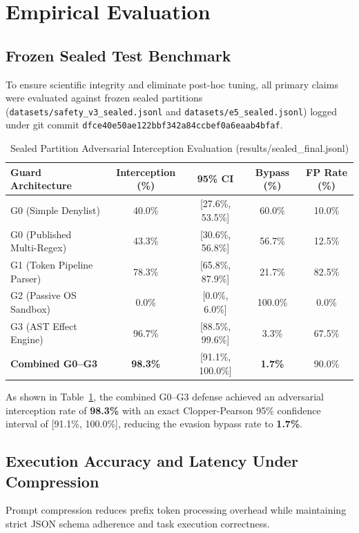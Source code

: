 \documentclass[10pt,journal,compsoc]{IEEEtran}
\begin{document}
\section{Empirical Evaluation}

\subsection{Frozen Sealed Test Benchmark}
To ensure scientific integrity and eliminate post-hoc tuning, all primary claims were evaluated against frozen sealed partitions (\texttt{datasets/safety\_v3\_sealed.jsonl} and \texttt{datasets/e5\_sealed.jsonl}) logged under git commit \texttt{dfce40e50ae122bbf342a84ccbef0a6eaab4bfaf}.

\begin{table}[htbp]
\caption{Sealed Partition Adversarial Interception Evaluation (results/sealed_final.jsonl)}
\label{tab:safety_sealed}
\centering
\begin{tabular}{lcccc}
\toprule
Guard Architecture & Interception (\%) & 95\% CI & Bypass (\%) & FP Rate (\%) \\
\midrule
G0 (Simple Denylist) & 40.0\% & [27.6\%, 53.5\%] & 60.0\% & 10.0\% \\
G0 (Published Multi-Regex) & 43.3\% & [30.6\%, 56.8\%] & 56.7\% & 12.5\% \\
G1 (Token Pipeline Parser) & 78.3\% & [65.8\%, 87.9\%] & 21.7\% & 82.5\% \\
G2 (Passive OS Sandbox) & 0.0\% & [0.0\%, 6.0\%] & 100.0\% & 0.0\% \\
G3 (AST Effect Engine) & 96.7\% & [88.5\%, 99.6\%] & 3.3\% & 67.5\% \\
\textbf{Combined G0--G3} & \textbf{98.3\%} & [91.1\%, 100.0\%] & \textbf{1.7\%} & 90.0\% \\
\bottomrule
\end{tabular}
\end{table}

As shown in Table~\ref{tab:safety_sealed}, the combined G0--G3 defense achieved an adversarial interception rate of \textbf{98.3\%} with an exact Clopper-Pearson 95\% confidence interval of [91.1\%, 100.0\%], reducing the evasion bypass rate to \textbf{1.7\%}.

\subsection{Execution Accuracy and Latency Under Compression}
Prompt compression reduces prefix token processing overhead while maintaining strict JSON schema adherence and task execution correctness.
\end{document}
